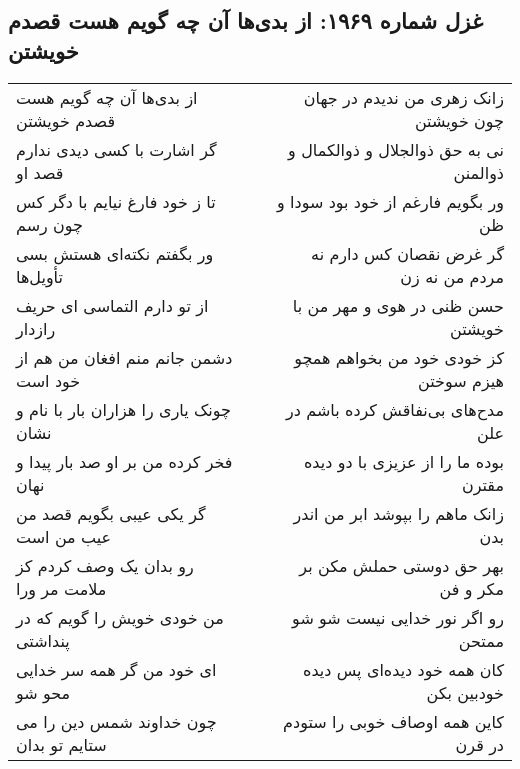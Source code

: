 \begin{center}
\section*{غزل شماره ۱۹۶۹: از بدی‌ها آن چه گویم هست قصدم خویشتن}
\label{sec:1969}
\begin{longtable}{l p{0.5cm} r}
از بدی‌ها آن چه گویم هست قصدم خویشتن
&&
زانک زهری من ندیدم در جهان چون خویشتن
\\
گر اشارت با کسی دیدی ندارم قصد او
&&
نی به حق ذوالجلال و ذوالکمال و ذوالمنن
\\
تا ز خود فارغ نیایم با دگر کس چون رسم
&&
ور بگویم فارغم از خود بود سودا و ظن
\\
ور بگفتم نکته‌ای هستش بسی تأویل‌ها
&&
گر غرض نقصان کس دارم نه مردم من نه زن
\\
از تو دارم التماسی ای حریف رازدار
&&
حسن ظنی در هوی و مهر من با خویشتن
\\
دشمن جانم منم افغان من هم از خود است
&&
کز خودی خود من بخواهم همچو هیزم سوختن
\\
چونک یاری را هزاران بار با نام و نشان
&&
مدح‌های بی‌نفاقش کرده باشم در علن
\\
فخر کرده من بر او صد بار پیدا و نهان
&&
بوده ما را از عزیزی با دو دیده مقترن
\\
گر یکی عیبی بگویم قصد من عیب من است
&&
زانک ماهم را بپوشد ابر من اندر بدن
\\
رو بدان یک وصف کردم کز ملامت مر ورا
&&
بهر حق دوستی حملش مکن بر مکر و فن
\\
من خودی خویش را گویم که در پنداشتی
&&
رو اگر نور خدایی نیست شو شو ممتحن
\\
ای خود من گر همه سر خدایی محو شو
&&
کان همه خود دیده‌ای پس دیده خودبین بکن
\\
چون خداوند شمس دین را می ستایم تو بدان
&&
کاین همه اوصاف خوبی را ستودم در قرن
\\
\end{longtable}
\end{center}
